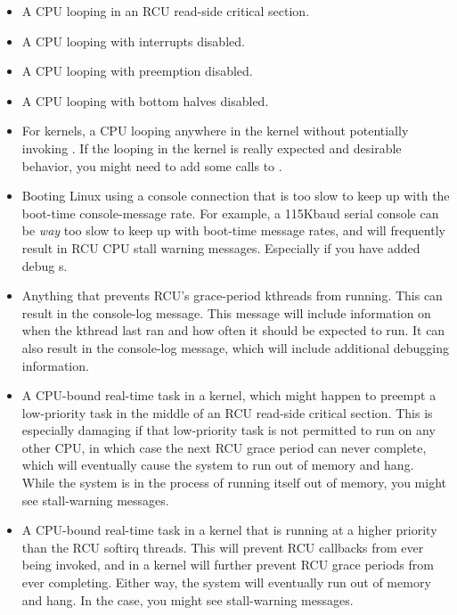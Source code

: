\begin{itemize}
\item	A CPU looping in an RCU read-side critical section.

\item	A CPU looping with interrupts disabled.

\item	A CPU looping with preemption disabled.

\item	A CPU looping with bottom halves disabled.

\item	For  kernels, a CPU looping anywhere in the
	kernel without potentially invoking .
	If the looping
	in the kernel is really expected and desirable behavior, you
	might need to add some calls to .

\item	Booting Linux using a console connection that is too slow to
	keep up with the boot-time console-message rate.
	For example,
	a 115Kbaud serial console can be \emph{way} too slow to keep up
	with boot-time message rates, and will frequently result in
	RCU CPU stall warning messages.
	Especially if you have added
	debug s.

\item	Anything that prevents RCU's grace-period kthreads from running.
	This can result in the  console-log message.
	This message will include information on when the kthread last
	ran and how often it should be expected to run.
        It can also
	result in the  console-log message,
	which will include additional debugging information.

\item	A CPU-bound real-time task in a  kernel, which might
	happen to preempt a low-priority task in the middle of an RCU
	read-side critical section.
	This is especially damaging if
	that low-priority task is not permitted to run on any other CPU,
	in which case the next RCU grace period can never complete, which
	will eventually cause the system to run out of memory and hang.
	While the system is in the process of running itself out of
	memory, you might see stall-warning messages.

\item	A CPU-bound real-time task in a  kernel that
	is running at a higher priority than the RCU softirq threads.
	This will prevent RCU callbacks from ever being invoked,
	and in a  kernel will further prevent
	RCU grace periods from ever completing.
	Either way, the
	system will eventually run out of memory and hang.
	In the
	 case, you might see stall-warning
	messages.


\end{itemize}
